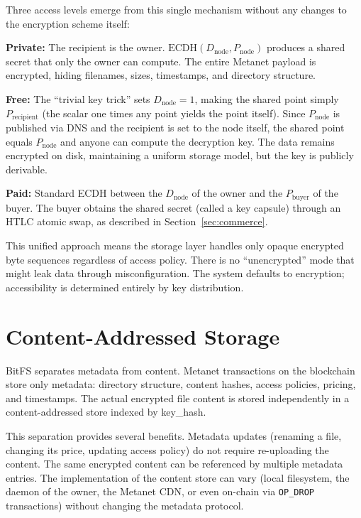 \documentclass[11pt,a4paper]{article}
\begin{document}
Three access levels emerge from this single mechanism without any changes to the encryption scheme itself:

\textbf{Private:} The recipient is the owner. $\text{ECDH}(D_{\text{node}}, P_{\text{node}})$ produces a shared secret that only the owner can compute. The entire Metanet payload is encrypted, hiding filenames, sizes, timestamps, and directory structure.

\textbf{Free:} The ``trivial key trick'' sets $D_{\text{node}} = 1$, making the shared point simply $P_{\text{recipient}}$ (the scalar one times any point yields the point itself). Since $P_{\text{node}}$ is published via DNS and the recipient is set to the node itself, the shared point equals $P_{\text{node}}$ and anyone can compute the decryption key. The data remains encrypted on disk, maintaining a uniform storage model, but the key is publicly derivable.

\textbf{Paid:} Standard ECDH between the $D_{\text{node}}$ of the owner and the $P_{\text{buyer}}$ of the buyer. The buyer obtains the shared secret (called a key capsule) through an HTLC atomic swap, as described in Section~\ref{sec:commerce}.

This unified approach means the storage layer handles only opaque encrypted byte sequences regardless of access policy. There is no ``unencrypted'' mode that might leak data through misconfiguration. The system defaults to encryption; accessibility is determined entirely by key distribution.

\section{Content-Addressed Storage}

BitFS separates metadata from content. Metanet transactions on the blockchain store only metadata: directory structure, content hashes, access policies, pricing, and timestamps. The actual encrypted file content is stored independently in a content-addressed store indexed by key\_hash.

This separation provides several benefits. Metadata updates (renaming a file, changing its price, updating access policy) do not require re-uploading the content. The same encrypted content can be referenced by multiple metadata entries. The implementation of the content store can vary (local filesystem, the daemon of the owner, the Metanet CDN, or even on-chain via \texttt{OP\_DROP} transactions) without changing the metadata protocol.
\end{document}
